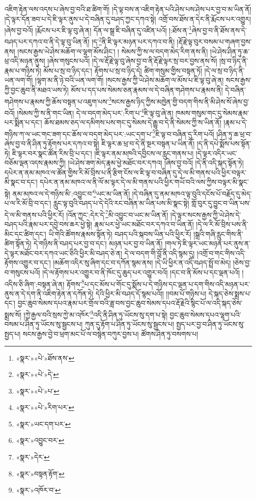འཇིག་རྟེན་ལས་འདས་པ་ཞེས་བྱ་བའི་ཐ་ཚིག་གོ། །དེ་ལྟ་བས་ན་འཇིག་རྟེན་པའི་ཤེས་པས་ཤེས་པར་བྱ་བ་མ་ཡིན་ནོ། །དེ་ལྟར་དོན་ཟབ་པ་དེ་ཇི་ལྟར་ནུས་པ་དེ་བཞིན་དུ་བཤད་ཀྱང་དཀའ་སྟེ། འགྲོ་བས་ཐོས་ན་དེར་ནི་རྨོངས་པར་འགྱུར། །ཞེས་བྱ་བའོ། །རྨོངས་པར་ཇི་ལྟ་བུ་ཞེ་ན། དོན་ལ་སྒྲ་ཇི་བཞིན་དུ་འཛིན་པའོ། །:ཐོས་ན་\footnote{«སྣར་»«པེ་»ཐོས་ནས་}ཞེས་བྱ་བ་ནི་ཐོས་ནས་དེ་བཤད་པར་དཀའ་བ་ནི་དེ་ལྟ་བུ་ཡིན་ནོ། །ད་\footnote{«སྣར་»«པེ་»དེ་}ནི་ཇི་ལྟར་མཉན་པར་དཀའ་བ་ནི། །རྡོ་རྗེ་ལྟ་བུར་བསམ་པ་གཞག་བྱས་ནས། །སངས་རྒྱས་ཡེ་ཤེས་མཆོག་ལ་ལྷག་མོས་ཤིང་། །
སེམས་ཀྱི་ས་ལ་བདག་མེད་རིག་ནས་ནི། །ཡེ་ཤེས་ཤིན་ཏུ་ཆ་ཕྲ་འདི་མཉན་ནུས། །ཞེས་གསུངས་པའོ། །དེ་ལ་རྡོ་རྗེ་ལྟ་བུ་ཞེས་བྱ་བ་ནི་རྡོ་རྗེ་ལྟར་སྲ་བར་བྱས་ནས་སོ། །སྲ་བ་ཉིད་ནི་རྣམ་པ་གཉིས་ཏེ། མོས་པ་སྲ་བ་ཉིད་དང་། རྟོགས་པ་སྲ་བ་ཉིད་དེ། ཚིག་གསུམ་གྱིས་བསྟན་ཏོ། །དེ་ལ་སྲ་བ་ཉིད་ནི་ཡན་ལག་གོ། །ལྷག་མ་ནི་ཉེ་བའི་ཡན་ལག་གོ། །སངས་རྒྱས་ཀྱི་ཡེ་ཤེས་མཆོག་ལ་མོས་པ་ཇི་ལྟ་བུ་ཞེ་ན། སངས་རྒྱས་ཀྱི་བྱང་ཆུབ་ནི་མཐའ་ཡས་ཏེ། མོས་པ་དད་པས་སེམས་ཅན་རྣམས་ལ་དེ་བཞིན་གཤེགས་པ་རྣམས་ནི། དེ་བཞིན་གཤེགས་པ་རྣམས་ཀྱི་ཆོས་བསྟན་པ་འཇུག་པས་\footnote{«སྣར་»«པེ་»པ་}སངས་རྒྱས་ཉིད་ཀྱིས་མཁྱེན་གྱི་བདག་གིས་ནི་མི་ཤེས་སོ་ཞེས་བྱ་བའོ། །སེམས་ཀྱི་ས་ནི་གང་ཡིན། དེ་ལ་བདག་མེད་པར་:རིག་པ་\footnote{«སྣར་»«པེ་»རིག་པར་}ཇི་ལྟ་བུ་ཞེ་ན། ཁམས་གསུམ་གང་དུ་སེམས་རྣམ་པར་སྨིན་པ་དང་། ཆོས་ཐམས་ཅད་ལ་དམིགས་པས་གང་དུ་སེམས་དེ་རྒྱུ་བ་དེ་ནི་སེམས་ཀྱི་ས་ཡིན་ནོ། །རྣམ་པ་དེ་གཉིས་ཀ་ལ་ཡང་གང་ཟག་དང་ཆོས་ལ་བདག་མེད་པར་:ཡང་དག་པ་\footnote{«སྣར་»ཡང་དག་པར་}ཇི་ལྟ་བ་བཞིན་དུ་རིག་པའོ། །ཤིན་ཏུ་ཆ་ཕྲ་བ་ཞེས་བྱ་བ་ནི་ཤིན་ཏུ་རྟོགས་པར་དཀའ་བ་སྟེ། ཇི་ལྟར་ཆ་ཕྲ་བ་དེ་ནི་སྔར་བསྟན་པ་ཡིན་ནོ། །ད་ནི་དཔེ་སྨོས་པས་སྟོན་ཏེ། ཇི་ལྟར་བར་སྣང་ཚོན་རིས་བྲི་པ་དང་། །ཇི་ལྟར་ནམ་མཁའི་དབྱིངས་ལ་རླུང་གནས་པ། །དེ་ལྟར་འདིར་ཡང་བཅོམ་ལྡན་འདས་རྣམས་ཀྱི། །ཡེ་ཤེས་ཟག་མེད་རྣམ་ཕྱེ་མཐོང་བར་དཀའ། །ཞེས་བྱ་བའོ། །དེ་ནི་འདི་སྐད་སྟོན་ཏེ། དཔེར་ན་ནམ་མཁའ་ལ་ཚོན་གྱིས་རི་མོ་བྲིས་པ་ནི་རྩིག་ངོས་ལ་ཇི་ལྟ་བ་བཞིན་དུ་དེ་ལ་མི་གནས་པའི་ཕྱིར་བལྟར་མི་སྣང་བ་དང་། དཔེར་ན་ནམ་མཁའ་ལ་ནི་ལོ་མ་ལྟར་དེ་ལ་མི་གནས་པའི་ཕྱིར་གཡོ་བའི་ལས་ཀྱིས་བལྟར་མི་སྣང་སྟེ། ནམ་མཁའ་ལ་དེ་གཉིས་མི་:འབྱུང་བ་\footnote{«སྣར་»འབྱུང་བར་}ཡང་མ་ཡིན་ནོ། །དེ་བཞིན་དུ་ནམ་མཁའ་ལྟ་བུའི་དངོས་པོ་བརྗོད་དུ་མེད་པ་ལ་རི་མོ་བྲི་བ་དང་། རླུང་ལྟ་བུའི་བཤད་པ་དེ་དེའི་རང་བཞིན་མ་ཡིན་པས་མི་སྣང་སྟེ། གློ་བུར་དུ་བྱུང་བ་ཡིན་པས་དེ་ལ་མི་གནས་པའི་ཕྱིར་རོ། །འོན་ཀྱང་:དེར་དེ་\footnote{«སྣར་»དེར་}མི་འབྱུང་བ་ཡང་མ་ཡིན་ནོ། །དེ་ལྟར་སངས་རྒྱས་ཀྱི་ཡེ་ཤེས་དེ་བཤད་པའི་རྣམ་པར་དབྱེ་བས་ཆར་ཕྱེ་སྟེ། རྣམ་པར་ཕྱེ་ཡང་མཐོང་བར་དཀའ་བ་ཡིན་ནོ། །དེ་ལ་རི་མོ་བྲིས་པས་ནི་མིང་དང་ཚིག་དང་། ཡི་གེའི་ཚོགས་རྣམས་སྟོན་ཏེ། བཤད་པའི་སྐབས་ཡིན་པའི་ཕྱིར་རོ། །སྒྲའི་གཞི་རླུང་གིས་ནི་ཚིག་སྟོན་ཏེ། དེ་གཉིས་ནི་བཤད་པར་བྱ་བ་དང་། མཉན་པར་བྱ་བ་ཡིན་ནོ། །གལ་ཏེ་ཇི་ལྟར་ཡང་མཉན་པར་ནུས་ན་དེ་ལྟར་མཐོང་བར་དཀའ་ཡང་ཅིའི་ཕྱིར་མི་བཤད་ཅེ་ན། དེ་ལ་བདག་གི་བློ་ནི་འདི་སྙམ་དུ། །འགྲོ་བ་གང་གིས་འདི་རྟོགས་འགྱུར་བ་དང་། །མཆོག་འདིར་སུ་ཞིག་དང་བ་དཀོན་སྙམ་ནས། །དེ་ཡི་ཕྱིར་ན་འདི་བཤད་སྤྲོ་བ་མེད། །ཅེས་བྱ་བ་གསུངས་པའོ། །དེ་ལ་རྟོགས་པར་འགྱུར་བ་ནི་ཁོང་དུ་ཆུད་པར་འགྱུར་བའོ། །དང་བ་ནི་མོས་པ་དང་ལྡན་པའོ། །འདིས་ཅི་ཞིག་:བསྟན་ཞེ་ན། རྟོགས་\footnote{«སྣར་»བསྟན་རྟོག་}པ་དང་མོས་པ་གོང་དུ་སྨོས་པ་དེ་གཉིས་དང་ལྡན་པ་དག་གིས་འདི་མཉན་པར་ནུས་ན་དེ་དག་ནི་འཇིག་རྟེན་ན་དཀོན་ཏེ། དེའི་ཕྱིར་མི་བཤད་དོ་སྙམ་པའོ།། །།བམ་པོ་གཉིས་པ། དེ་སྐད་ཅེས་སྨྲས་པ་དང་། བྱང་ཆུབ་སེམས་དཔའ་རྣམ་པར་གྲོལ་བའི་ཟླ་བས་བྱང་ཆུབ་སེམས་དཔའ་རྡོ་རྗེའི་སྙིང་པོ་ལ་འདི་སྐད་ཅེས་སྨྲས་སོ། །ཀྱེ་རྒྱལ་བའི་སྲས་ཀྱེ་མ་འཁོར་\footnote{«སྣར་»འཁོར་བ་}འདི་ནི་ཤིན་ཏུ་ཡོངས་སུ་དག་པ་སྟེ། བྱང་ཆུབ་སེམས་དཔའ་ལྷག་པའི་བསམ་པ་ཤིན་ཏུ་ཡོངས་སུ་སྦྱངས་པ། ཀུན་དུ་རྟོག་པ་ཤིན་ཏུ་ཡོངས་སུ་སྦྱངས་པ། སྤྱད་པར་བྱ་བ་ཤིན་ཏུ་ཡོངས་སུ་སྤྱད་པ། སངས་རྒྱས་བྱེ་བ་ཕྲག་མང་པོ་ལ་བསྙེན་བཀུར་བྱས་པ། ཚོགས་ཤིན་ཏུ་བསགས་པ། 